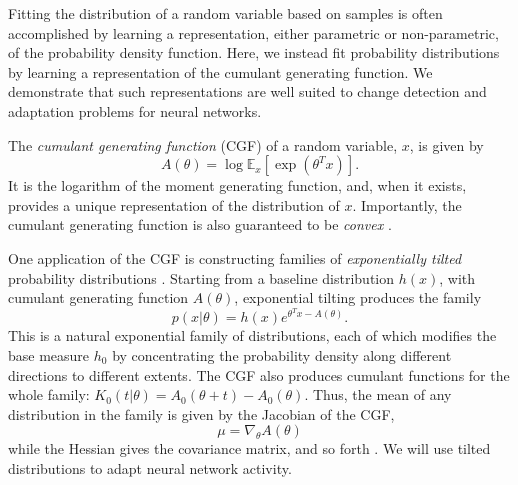 \documentclass[10pt]{article}      %
\begin{document}
Fitting the distribution of a random variable based on samples is often accomplished by learning a representation, either parametric or non-parametric, of the probability density function.
Here, we instead fit probability distributions by learning a representation of the cumulant generating function.
We demonstrate that such representations are well suited to change detection and adaptation problems for neural networks.

The \textit{cumulant generating function} (CGF) of a random variable, $x$, is given by
\begin{equation}
  A(\theta) = \log \mathbb{E}_x[\exp(\theta^T x)]. \label{def:cgf}
\end{equation}
It is the logarithm of the moment generating function, and, when it exists, provides a unique representation of the distribution of $x$.
Importantly, the cumulant generating function is also guaranteed to be \textit{convex} \cite{barndorff2014information}.


One application of the CGF is constructing families of \textit{exponentially tilted} probability distributions \cite{morris_natural_1982,morris_unifying_2009}.
Starting from a baseline distribution $h(x)$, with cumulant generating function $A(\theta)$, exponential tilting produces the family
\begin{equation}
  p(x | \theta) = h(x) e^{\theta^T x - A(\theta)}. \label{def:exponential_tilt}
\end{equation}
This is a natural exponential family of distributions, each of which modifies the base measure $h_0$ by concentrating the probability density along different directions to different extents.
The CGF also produces cumulant functions for the whole family: ${K_0(t | \theta) = A_0(\theta + t) - A_0(\theta)}$.
Thus, the mean of any distribution in the family is given by the Jacobian of the CGF,
\begin{equation}
  \mu = \nabla_\theta A(\theta) \label{eq:cgf_jacobian}
\end{equation}
while the Hessian gives the covariance matrix, and so forth \cite{barndorff2014information}.
We will use tilted distributions to adapt neural network activity.
\end{document}
